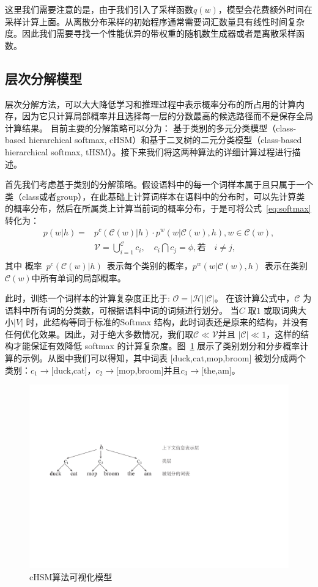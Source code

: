 这里我们需要注意的是，由于我们引入了采样函数$q(w)$，模型会花费额外时间在采样计算上面。从离散分布采样的初始程序通常需要词汇数量具有线性时间复杂度。因此我们需要寻找一个性能优异的带权重的随机数生成器或者是离散采样函数。


\subsection{层次分解模型}
层次分解方法，可以大大降低学习和推理过程中表示概率分布的所占用的计算内存，因为它只计算局部概率并且选择每一层的分数最高的候选路径而不是保存全局计算结果。
目前主要的分解策略可以分为： 基于类别的多元分类模型（class-based hierarchical softmax, cHSM）和基于二叉树的二元分类模型（class-based hierarchical softmax, tHSM）。接下来我们将这两种算法的详细计算过程进行描述。

首先我们考虑基于类别的分解策略。假设语料中的每一个词样本属于且只属于一个类（class或者group），在此基础上计算词样本在语料中的分布时，可以先计算类的概率分布，然后在所属类上计算当前词的概率分布，于是可将公式~\ref{eq:softmax} 转化为：
  \begin{equation}
  \begin{split}
p(w|h)=&p^c(\mathcal{C}(w)|h)\cdot p^w(w|\mathcal{C}(w),h) , w\in \mathcal{C}(w),\\
&\mathcal{V}=\bigcup _{i = 1}^\mathcal{C}{c_i},\quad  c_i \bigcap c_j=\phi, \text{若}\quad i\ne j, \\
\end{split}
\end{equation}
其中 概率~$p^c(\mathcal{C}(w)|h)$~表示每个类别的概率，$p^w(w|\mathcal{C}(w),h)$~表示在类别$\mathcal{C}(w)$中所有单词的局部概率。

此时，训练一个词样本的计算复杂度正比于: $\mathcal{O =|H||C|}$。 在该计算公式中，$\mathcal{C}$ 为语料中所有词的分类数，可根据语料中词的词频进行划分。 当$C$ 取$1$ 或取词典大小$|V|$ 时，此结构等同于标准的Softmax 结构，此时词表还是原来的结构，并没有任何优化效果。因此，对于绝大多数情况，我们取$\mathcal{C} \ll \mathcal{V}$并且 $|\mathcal{C}|\ll 1$，这样的结构才能保证有效降低 softmax 的计算复杂度。图~\ref{fig:case_hsm} 展示了类别划分和分步概率计算的示例。从图中我们可以得知，其中词表 [duck,cat,mop,broom] 被划分成两个类别：$c_1\to$[duck,cat]，$c_2\to$[mop,broom]并且$c_3\to$[the,am]。
\begin{figure}[!h]
  \centering
\includegraphics[width=0.79\linewidth]{./figures/case_chsm.pdf}
\caption{cHSM算法可视化模型}\label{fig:case_hsm}
\end{figure}

